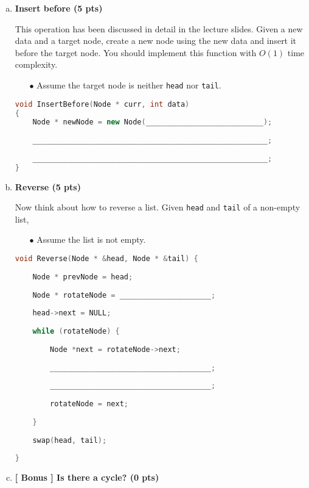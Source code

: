 \documentclass[10.5pt]{article}
\begin{document}
	\begin{enumerate}[(a)]
		\item \textbf{Insert before (5 pts)}
		
		This operation has been discussed in detail  in the lecture slides. Given a new data and a target node, create a new node using the new data and insert it before the target node. You should implement this function with $O(1)$ time complexity.
		\begin{enumerate}
			\item[$\bullet$] Assume the target node is neither \texttt{head} nor \texttt{tail}.
		\end{enumerate}
		
		\hrulefill
		\begin{lstlisting}[language=C++,moreclass={Node}]
void InsertBefore(Node * curr, int data)
{
	Node * newNode = new Node(___________________________);
	
	______________________________________________________;
	
	______________________________________________________;
}
		\end{lstlisting}
		\item \textbf{Reverse (5 pts)}
		
		Now think about how to reverse a list.
		Given \texttt{head} and \texttt{tail} of a non-empty list,
		\begin{enumerate}
			\item[$\bullet$] Assume the list is not empty.
		\end{enumerate}
		\hrulefill
		\begin{lstlisting}[language=C++,moreclass={Node}]
void Reverse(Node * &head, Node * &tail) {
		
	Node * prevNode = head;
	
	Node * rotateNode = _____________________;
	
	head->next = NULL;
	
	while (rotateNode) {
		
		Node *next = rotateNode->next;
		
		_____________________________________;
		
		_____________________________________;
		
		rotateNode = next;
		
	}
	
	swap(head, tail);
	
}
		\end{lstlisting}
		
		\item \textbf{[ Bonus ] Is there a cycle? (0 pts)}
		

\end{enumerate}
\end{document}
